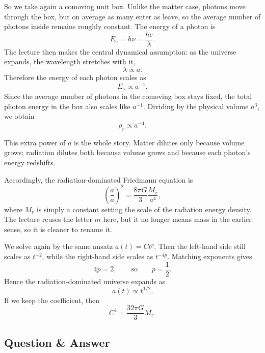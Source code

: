 So we take again a comoving unit box. Unlike the matter case, photons move through the box, but on average as many enter as leave, so the average number of photons inside remains roughly constant. The energy of a photon is
\begin{equation}
E_\gamma=h\nu=\frac{hc}{\lambda}.
\end{equation}
The lecture then makes the central dynamical assumption: as the universe expands, the wavelength stretches with it,
\begin{equation}
\lambda\propto a.
\end{equation}
Therefore the energy of each photon scales as
\begin{equation}
E_\gamma\propto a^{-1}.
\end{equation}
Since the average number of photons in the comoving box stays fixed, the total photon energy in the box also scales like \(a^{-1}\). Dividing by the physical volume \(a^3\), we obtain
\begin{equation}
\rho_r\propto a^{-4}.
\end{equation}

This extra power of \(a\) is the whole story. Matter dilutes only because volume grows; radiation dilutes both because volume grows and because each photon's energy redshifts.

Accordingly, the radiation-dominated Friedmann equation is
\begin{equation}
\left(\frac{\dot a}{a}\right)^2=\frac{8\pi G}{3}\frac{M_r}{a^4},
\end{equation}
where \(M_r\) is simply a constant setting the scale of the radiation energy density. The lecture reuses the letter \(m\) here, but it no longer means mass in the earlier sense, so it is cleaner to rename it.

We solve again by the same ansatz \(a(t)=Ct^p\). Then the left-hand side still scales as \(t^{-2}\), while the right-hand side scales as \(t^{-4p}\). Matching exponents gives
\begin{equation}
4p=2,
\qquad\text{so}\qquad
p=\frac{1}{2}.
\end{equation}
Hence the radiation-dominated universe expands as
\begin{equation}
a(t)\propto t^{1/2}.
\end{equation}
If we keep the coefficient, then
\begin{equation}
C^4=\frac{32\pi G}{3}M_r.
\end{equation}

\subsection{Question \& Answer}

